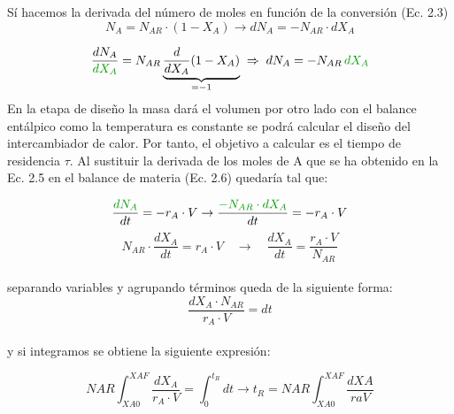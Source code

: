 \begin{raggedright}
    Sí hacemos la derivada del número de moles en función de la conversión (Ec. 2.3)
    \begin{equation}
        N_A = N_{AR} \cdot (1-X_A) \rightarrow dN_A = -N_{AR} \cdot dX_A
    \end{equation}

    \begin{equation}
        \frac{dN_A}{\textcolor{darkgreen}{dX_A}}
        = N_{AR} \underbrace{\frac{d}{dX_A}(1 - X_A)}_{=-1}
        \;\Rightarrow\;
        dN_A = -N_{AR} \, \textcolor{darkgreen}{dX_A}
    \end{equation}
    En la etapa de diseño la masa dará el volumen por otro lado con el balance entálpico como la temperatura es constante se podrá calcular el diseño del intercambiador de calor.
    Por tanto, el objetivo a calcular es el tiempo de residencia \hyperlink{tau}{$\tau$}.
    Al sustituir la derivada de los moles de A que se ha obtenido en la Ec. 2.5 en el balance de materia (Ec. 2.6) quedaría tal que:

    \begin{equation}
        \frac{\textcolor{darkgreen}{dN_A}}{dt} = -r_A \cdot V \rightarrow \frac{\textcolor{darkgreen}{-N_{AR} \cdot dX_A}}{dt} = -r_A \cdot V
    \end{equation}
    \hypertarget{Ec2.8}{}
    \begin{equation}
        N_{AR} \cdot \frac{dX_A}{dt} = r_A \cdot V \hspace{1em}\rightarrow \hspace{1em}\frac{dX_A}{dt} = \frac{r_A \cdot V}{N_{AR}}
    \end{equation}\\ \vspace{1em}
    separando variables y agrupando términos queda de la siguiente forma:
    \begin{equation}
        \frac{dX_A \cdot N_{AR}}{r_A \cdot V} = dt
    \end{equation}\\ \vspace{1em}
    y si integramos se obtiene la siguiente expresión:

    \begin{equation}
        NAR \int_{XA0}^{XAF} \frac{dX_A}{r_A \cdot V} = \int_{0}^{t_R} dt \rightarrow t_R = NAR \int_{XA0}^{XAF} \frac{dXA}{ra V}
    \end{equation}\\ \vspace{1em}


\end{raggedright}
